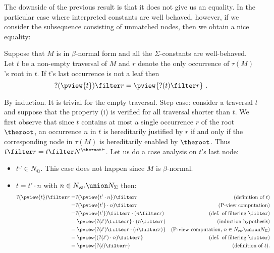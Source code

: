 The downside of the previous result is that it does not give us an
equality. In the particular case where interpreted constants are well
behaved, however, if we consider the subsequence consisting of
unmatched nodes, then we obtain a nice equality:
\begin{lemma}
\label{lem:betanf_wellbehavedconst_trav_pview_red} Suppose that $M$
is in $\beta$-normal form and all the $\Sigma$-constants are
well-behaved. Let $t$ be a non-empty traversal of $M$ and $r$ denote
the only occurrence of $\tau(M)$'s root in $t$. If $t$'s last
occurrence is not a leaf then
$$ ?(\pview{t}) \filter r = \pview{?(t) \filter  r }\ .$$
\end{lemma}
\proof By induction. It is trivial for the empty traversal. Step
case: consider a traversal $t$ and suppose that the property (i) is
verified for all traversal shorter than $t$. We first observe that
since $t$ contains at most a single occurrence $r$ of the root
$\theroot$, an occurrence $n$ in $t$ is hereditarily justified by
$r$ if and only if the corresponding node in $\tau(M)$ is
hereditarily enabled by $\theroot$. Thus $t\filter r = t \filter
N^{\theroot \vdash}$. Let us do a case analysis on $t$'s last node:
\begin{itemize}
\item $t^\omega \in N_@$. This case does not happen since $M$ is $\beta$-normal.

\item $t = t' \cdot n$ with $n \in N_{\sf var} \union N_\Sigma$ then:
    \begin{align*}
    ?(\pview{t}) \filter  r
        &= ?(\pview{t' \cdot n}) \filter  r & (\mbox{definition of } t)\\
        &= ?(\pview{t'} \cdot n) \filter  r  & (\mbox{P-view computation}) \\
        &= ?(\pview{t'}) \filter  r  \cdot (n \filter  r)            & (\mbox{def. of filtering $\filter$}) \\
        &= \pview{?(t') \filter r} \cdot (n \filter  r)           & (\mbox{induction hypothesis}) \\
        &= \pview{?(t') \filter  r \cdot (n \filter  r) } & (\mbox{P-view computation, $n \in N_{\sf var} \union N_{\Sigma}$}) \\
        &= \pview{(?(t') \cdot n ) \filter  r }           & (\mbox{def. of filtering $\filter$}) \\
        &= \pview{?(t) \filter  r  }
 & (\mbox{definition of } t).
    \end{align*}
\end{itemize}
